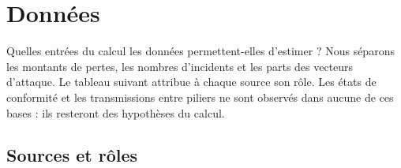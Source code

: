 ﻿%

\chapter{Données}
\label{chap:donnees}
\label{part:donnees}


Quelles entrées du calcul les données permettent-elles d'estimer ? Nous séparons les montants
de pertes, les nombres d'incidents et les parts des vecteurs d'attaque. Le tableau suivant attribue
à chaque source son rôle. Les états de conformité et les transmissions entre piliers ne sont
observés dans aucune de ces bases : ils resteront des hypothèses du calcul.

\section{Sources et rôles}
\label{sec:carto}

